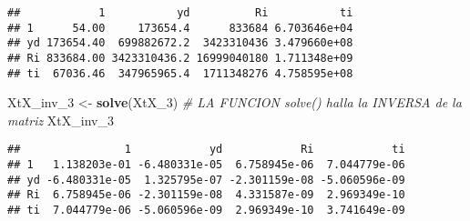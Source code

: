 \documentclass[
]{article}
\newenvironment{Shaded}{\begin{snugshade}}{\end{snugshade}}
\newcommand{\CommentTok}[1]{\textcolor[rgb]{0.56,0.35,0.01}{\textit{#1}}}
\newcommand{\DecValTok}[1]{\textcolor[rgb]{0.00,0.00,0.81}{#1}}
\newcommand{\KeywordTok}[1]{\textcolor[rgb]{0.13,0.29,0.53}{\textbf{#1}}}
\newcommand{\NormalTok}[1]{#1}
\newcommand{\OperatorTok}[1]{\textcolor[rgb]{0.81,0.36,0.00}{\textbf{#1}}}
\newcommand{\StringTok}[1]{\textcolor[rgb]{0.31,0.60,0.02}{#1}}
\begin{document}
\begin{Shaded}
\end{Shaded}

\begin{verbatim}
##            1           yd          Ri           ti
## 1      54.00     173654.4      833684 6.703646e+04
## yd 173654.40  699882672.2  3423310436 3.479660e+08
## Ri 833684.00 3423310436.2 16999040180 1.711348e+09
## ti  67036.46  347965965.4  1711348276 4.758595e+08
\end{verbatim}

\begin{Shaded}
\begin{Highlighting}[]
\NormalTok{XtX_inv_}\DecValTok{3}\NormalTok{ <-}\StringTok{ }\KeywordTok{solve}\NormalTok{(XtX_}\DecValTok{3}\NormalTok{)  }\CommentTok{# LA FUNCION solve() halla la INVERSA de la matriz }
\NormalTok{XtX_inv_}\DecValTok{3}
\end{Highlighting}
\end{Shaded}

\begin{verbatim}
##                1            yd            Ri            ti
## 1   1.138203e-01 -6.480331e-05  6.758945e-06  7.044779e-06
## yd -6.480331e-05  1.325795e-07 -2.301159e-08 -5.060596e-09
## Ri  6.758945e-06 -2.301159e-08  4.331587e-09  2.969349e-10
## ti  7.044779e-06 -5.060596e-09  2.969349e-10  3.741649e-09
\end{verbatim}

\begin{Shaded}
\end{Shaded}
\end{document}

